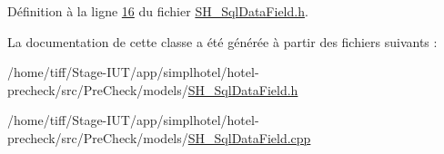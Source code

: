Définition à la ligne \hyperlink{SH__SqlDataField_8h_source_l00016}{16} du fichier \hyperlink{SH__SqlDataField_8h_source}{S\-H\-\_\-\-Sql\-Data\-Field.\-h}.



La documentation de cette classe a été générée à partir des fichiers suivants \-:\begin{DoxyCompactItemize}
\item 
/home/tiff/\-Stage-\/\-I\-U\-T/app/simplhotel/hotel-\/precheck/src/\-Pre\-Check/models/\hyperlink{SH__SqlDataField_8h}{S\-H\-\_\-\-Sql\-Data\-Field.\-h}\item 
/home/tiff/\-Stage-\/\-I\-U\-T/app/simplhotel/hotel-\/precheck/src/\-Pre\-Check/models/\hyperlink{SH__SqlDataField_8cpp}{S\-H\-\_\-\-Sql\-Data\-Field.\-cpp}\end{DoxyCompactItemize}
